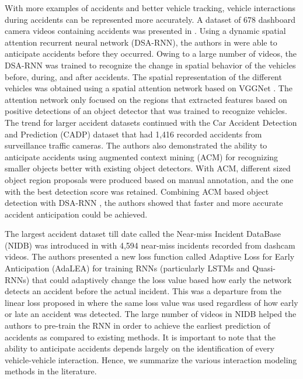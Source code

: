 \documentclass[final,journal]{IEEEtran}
\begin{document}
With more examples of accidents and better vehicle tracking, vehicle interactions during accidents can be represented more accurately. A dataset of 678 dashboard camera videos containing accidents was presented in \cite{anticipating1}. Using a dynamic spatial attention recurrent neural network (DSA-RNN), the authors in \cite{anticipating1} were able to anticipate accidents before they occurred. Owing to a large number of videos, the DSA-RNN was trained to recognize the change in spatial behavior of the vehicles before, during, and after accidents. The spatial representation of the different vehicles was obtained using a spatial attention network based on VGGNet \cite{vgg}. The attention network only focused on the regions that extracted features based on positive detections of an object detector that was trained to recognize vehicles. The trend for larger accident datasets continued with the Car Accident Detection and Prediction (CADP) dataset \cite{cadp} that had 1,416 recorded accidents from surveillance traffic cameras. The authors also demonstrated the ability to anticipate accidents using augmented context mining (ACM) for recognizing smaller objects better with existing object detectors. With ACM, different sized object region proposals were produced based on manual annotation, and the one with the best detection score was retained. Combining ACM based object detection with DSA-RNN \cite{anticipating1}, the authors showed that faster and more accurate accident anticipation could be achieved. 

The largest accident dataset till date called the Near-miss Incident DataBase (NIDB) was introduced in \cite{accident_anticipating2} with 4,594 near-miss incidents recorded from dashcam videos. The authors presented a new loss function called Adaptive Loss for Early Anticipation (AdaLEA) for training RNNs (particularly LSTMs and Quasi-RNNs) that could adaptively change the loss value based how early the network detects an accident before the actual incident. This was a departure from the linear loss proposed in \cite{anticipating1} where the same loss value was used regardless of how early or late an accident was detected. The large number of videos in NIDB helped the authors to pre-train the RNN in order to achieve the earliest prediction of accidents as compared to existing methods. It is important to note that the ability to anticipate accidents depends largely on the identification of every vehicle-vehicle interaction. Hence, we summarize the various interaction modeling methods in the literature.
\end{document}
